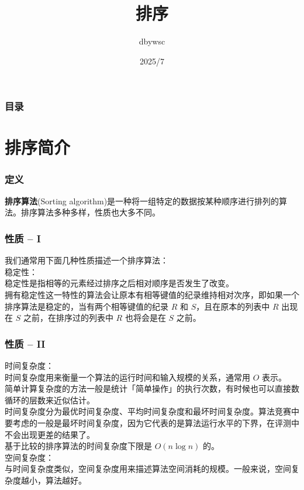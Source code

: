 \documentclass{beamer}
\title{排序}
\author{dbywsc}
\date{2025/7}
\newcommand{\fdf}[1]{\alert{\textbf{#1}}}
\begin{document}
	\frame{\titlepage}
\begin{frame}
	\frametitle{目录}
	\tableofcontents
\end{frame}
\section{排序简介}
\begin{frame}
\frametitle{定义}
\fdf{排序算法}(Sorting algorithm)是一种将一组特定的数据按某种顺序进行排列的算法。排序算法多种多样，性质也大多不同。
\end{frame}
\begin{frame}
\frametitle{性质 -- I}
我们通常用下面几种性质描述一个排序算法：\\ 
稳定性：\\ 
稳定性是指相等的元素经过排序之后相对顺序是否发生了改变。 \\
拥有稳定性这一特性的算法会让原本有相等键值的纪录维持相对次序，即如果一个排序算法是稳定的，当有两个相等键值的纪录 $R$ 和 $S$，且在原本的列表中 $R$ 出现在 $S$ 之前，在排序过的列表中 $R$ 也将会是在 $S$ 之前。\\
\end{frame}
\begin{frame}
\frametitle{性质 -- II}
时间复杂度： \\ 
时间复杂度用来衡量一个算法的运行时间和输入规模的关系，通常用 $O$ 表示。\\
简单计算复杂度的方法一般是统计「简单操作」的执行次数，有时候也可以直接数循环的层数来近似估计。\\
时间复杂度分为最优时间复杂度、平均时间复杂度和最坏时间复杂度。算法竞赛中要考虑的一般是最坏时间复杂度，因为它代表的是算法运行水平的下界，在评测中不会出现更差的结果了。\\
基于比较的排序算法的时间复杂度下限是 $O(n\log n)$ 的。\\
空间复杂度：\\ 
与时间复杂度类似，空间复杂度用来描述算法空间消耗的规模。一般来说，空间复杂度越小，算法越好。
\end{frame}
\end{document}
